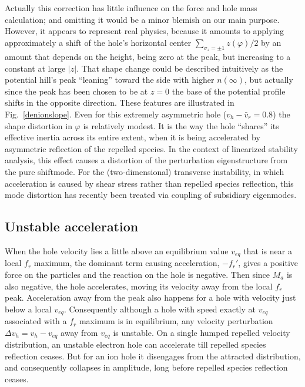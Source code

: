 \documentclass[aip,pop,article-title]{revtex4-2}
\begin{document}
Actually this correction has little influence on the force and hole
mass calculation; and omitting it would be a minor blemish on our main
purpose. However, it appears to represent real physics, because it
amounts to applying approximately a shift of the hole's horizontal
center $\sum_{\sigma_z=\pm1}z(\varphi)/2$ by an amount that depends on
the height, being zero at the peak, but increasing to a constant at
large $|z|$. That shape change could be described intuitively as the
potential hill's peak ``leaning'' toward the side with higher
$n(\infty)$, but actually since the peak has been chosen to be at
$z=0$ the base of the potential profile shifts in the opposite
direction. These features are illustrated in Fig.\
\ref{denionslope}. Even for this extremely asymmetric hole
($v_h-\bar v_r=0.8$) the shape distortion in $\varphi$ is relatively
modest. It is the way the hole ``shares'' its effective inertia across
its entire extent, when it is being accelerated by asymmetric
reflection of the repelled species.  In the context of linearized
stability analysis, this effect causes a distortion of the
perturbation eigenstructure from the pure shiftmode.  For the
(two-dimensional) transverse instability, in which acceleration is
caused by shear stress rather than repelled species reflection, this
mode distortion has recently been treated via coupling of subsidiary
eigenmodes\cite{Chen2023}.


\subsection{Unstable acceleration}
When the hole velocity lies a little above an equilibrium value
$v_{eq}$ that is near a local $f_r$ maximum, the dominant term causing
acceleration, $-f_r'$, gives a positive force on the particles and the
reaction on the hole is negative. Then since $M_a$ is also negative,
the hole accelerates, moving its velocity away from the local $f_r$
peak.  Acceleration away from the peak also happens for a hole with
velocity just below a local $v_{eq}$. Consequently although a hole
with speed exactly at $v_{eq}$ associated with a $f_r$ maximum is in
equilibrium, any velocity perturbation $\Delta v_h=v_h-v_{eq}$ away
from $v_{eq}$ is unstable. On a single humped repelled velocity
distribution, an unstable electron hole can accelerate till repelled
species reflection ceases. But for an ion hole it disengages from the
attracted distribution, and consequently collapses in amplitude, long
before repelled species reflection ceases.
\end{document}
